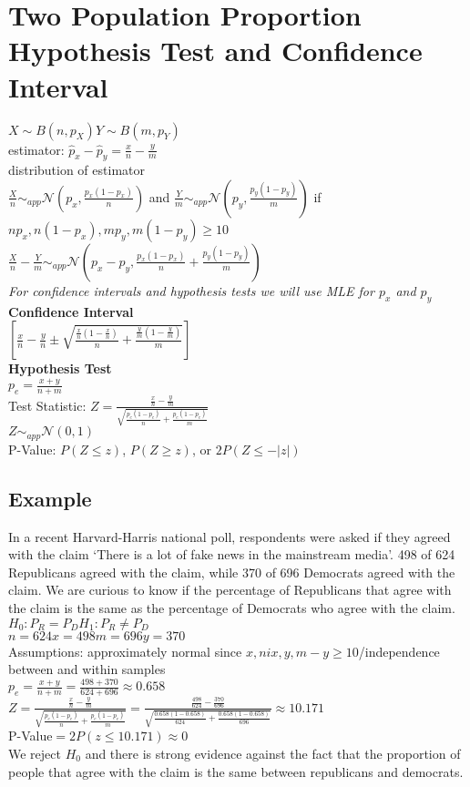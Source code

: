 \documentclass{article}
\begin{document}
\section{Two Population Proportion Hypothesis Test and Confidence Interval}
\label{sec:twoPProp}
$X\sim B(n,p_X)$\hspace*{0.5in}$Y\sim B(m,p_Y)$\\
estimator: $\hat p_x-\hat p_y=\frac{x}{n}-\frac{y}{m}$\\
distribution of estimator\\
$\frac{X}{n}\sim_{app}\mathcal{N}(p_x,\frac{p_x(1-p_x)}{n})$ and $\frac{Y}{m}\sim_{app}\mathcal{N}(p_y,\frac{p_y(1-p_y)}{m})$ if $np_x,n(1-p_x),mp_y,m(1-p_y)\geq 10$\\
$\frac{X}{n}-\frac{Y}{m}\sim_{app}\mathcal{N}(p_x-p_y,\frac{p_x(1-p_x)}{n}+\frac{p_y(1-p_y)}{m})$\\
\textit{For confidence intervals and hypothesis tests we will use MLE for $p_x$ and $p_y$}\\
\textbf{Confidence Interval}\\
$[\frac{x}{n}-\frac{y}{n}\pm\sqrt{\frac{\frac{x}{n}(1-\frac{x}{n})}{n}+\frac{\frac{y}{m}(1-\frac{y}{m})}{m}}]$\\
\textbf{Hypothesis Test}\\
$p_e=\frac{x+y}{n+m}$\\
Test Statistic: $Z=\frac{\frac{x}{n}-\frac{y}{m}}{\sqrt{\frac{p_e(1-p_e)}{n}+\frac{p_e(1-p_e)}{m}}}$\\
$Z\sim_{app}\mathcal{N}(0,1)$\\
P-Value: $P(Z\leq z)$, $P(Z\geq z)$, or $2P(Z\leq-\vert z\vert)$
\newpage
\subsection{Example}
In a recent Harvard-Harris national poll, respondents were asked if they
agreed with the claim ‘There is a lot of fake news in the mainstream media’.
498 of 624 Republicans agreed with the claim, while 370 of 696 Democrats
agreed with the claim. We are curious to know if the percentage of
Republicans that agree with the claim is the same as the percentage of
Democrats who agree with the claim.\\
$H_0:P_R=P_D$\hspace*{0.5in}$H_1:P_R\neq P_D$\\
$n=624$\hspace*{0.25in}$x=498$\hspace*{0.25in}$m=696$\hspace*{0.25in}$y=370$\\
Assumptions: approximately normal since $x,nix,y,m-y\geq 10$/independence between and within samples\\
$p_e=\frac{x+y}{n+m}=\frac{498+370}{624+696}\approx0.658$\\
$Z=\frac{\frac{x}{n}-\frac{y}{m}}{\sqrt{\frac{p_e(1-p_e)}{n}+\frac{p_e(1-p_e)}{m}}}=\frac{\frac{498}{624}-\frac{370}{696}}{\sqrt{\frac{0.658(1-0.658)}{624}+\frac{0.658(1-0.658)}{696}}}\approx10.171$\\
P-Value$=2P(z\leq 10.171)\approx0$\\
We reject $H_0$ and there is strong evidence against the fact that the proportion of people that agree with the claim is the same between republicans and democrats.
\end{document}
